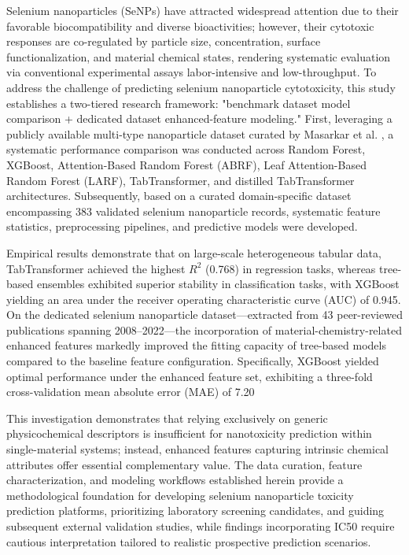Selenium nanoparticles (SeNPs) have attracted widespread attention due to their favorable biocompatibility and diverse bioactivities; however, their cytotoxic responses are co-regulated by particle size, concentration, surface functionalization, and material chemical states, rendering systematic evaluation via conventional experimental assays labor-intensive and low-throughput. To address the challenge of predicting selenium nanoparticle cytotoxicity, this study establishes a two-tiered research framework: "benchmark dataset model comparison + dedicated dataset enhanced-feature modeling." First, leveraging a publicly available multi-type nanoparticle dataset curated by Masarkar et al. \cite{masarkar2024}, a systematic performance comparison was conducted across Random Forest, XGBoost, Attention-Based Random Forest (ABRF), Leaf Attention-Based Random Forest (LARF), TabTransformer, and distilled TabTransformer architectures. Subsequently, based on a curated domain-specific dataset encompassing 383 validated selenium nanoparticle records, systematic feature statistics, preprocessing pipelines, and predictive models were developed.

Empirical results demonstrate that on large-scale heterogeneous tabular data, TabTransformer achieved the highest $R^2$ (0.768) in regression tasks, whereas tree-based ensembles exhibited superior stability in classification tasks, with XGBoost yielding an area under the receiver operating characteristic curve (AUC) of 0.945. On the dedicated selenium nanoparticle dataset—extracted from 43 peer-reviewed publications spanning 2008--2022—the incorporation of material-chemistry-related enhanced features markedly improved the fitting capacity of tree-based models compared to the baseline feature configuration. Specifically, XGBoost yielded optimal performance under the enhanced feature set, exhibiting a three-fold cross-validation mean absolute error (MAE) of 7.20%

This investigation demonstrates that relying exclusively on generic physicochemical descriptors is insufficient for nanotoxicity prediction within single-material systems; instead, enhanced features capturing intrinsic chemical attributes offer essential complementary value. The data curation, feature characterization, and modeling workflows established herein provide a methodological foundation for developing selenium nanoparticle toxicity prediction platforms, prioritizing laboratory screening candidates, and guiding subsequent external validation studies, while findings incorporating IC50 require cautious interpretation tailored to realistic prospective prediction scenarios.
